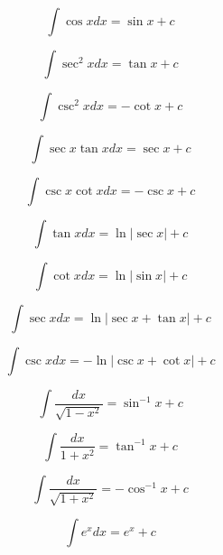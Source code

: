 \documentclass{article}
\begin{document}
\begin{equation}
\int \cos x dx = \sin x + c
\end{equation}

\begin{equation}
\int \sec^2 x dx = \tan x + c
\end{equation}

\begin{equation}
\int \csc^2 x dx = -\cot x + c
\end{equation}

\begin{equation}
\int \sec x \tan x dx = \sec x + c
\end{equation}

\begin{equation}
\int \csc x \cot x dx = -\csc x + c
\end{equation}

\begin{equation}
\int \tan x dx = \ln |\sec x| + c
\end{equation}

\begin{equation}
\int \cot x dx = \ln |\sin x| + c
\end{equation}

\begin{equation}
\int \sec x dx = \ln |\sec x + \tan x| + c
\end{equation}

\begin{equation}
\int \csc x dx = -\ln |\csc x + \cot x| + c
\end{equation}

\begin{equation}
\int \frac{dx}{\sqrt{1-x^2}} = \sin^{-1} x + c
\end{equation}

\begin{equation}
\int \frac{dx}{1+x^2} = \tan^{-1} x + c
\end{equation}

\begin{equation}
\int \frac{dx}{\sqrt{1+x^2}} = -\cos^{-1} x + c
\end{equation}

\begin{equation}
\int e^x dx = e^x + c
\end{equation}
\end{document}
